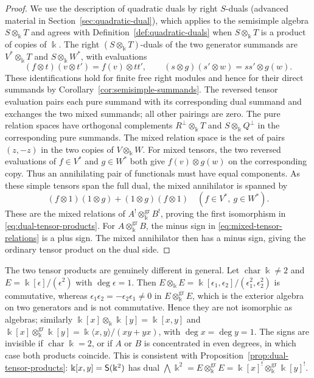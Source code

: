\begin{advanced}[suppressfirstparskip=true,innertopmargin=0pt]
\begin{proof}
We use the description of quadratic duals by right $S$-duals (advanced material in Section~\ref{sec:quadratic-dual}), which applies to the semisimple algebra $S\otimes_\Bbbk T$ and agrees with Definition~\ref{def:quadratic-duals} when $S\otimes_\Bbbk T$ is a product of copies of $\Bbbk$.
The right $(S\otimes_\Bbbk T)$-duals of the two generator summands are $V^*\otimes_\Bbbk T$ and $S\otimes_\Bbbk W^*$, with evaluations
\[
(f\otimes t)(v\otimes t')=f(v)\otimes tt',\qquad
(s\otimes g)(s'\otimes w)=ss'\otimes g(w).
\]
These identifications hold for finite free right modules and hence for their direct summands by Corollary~\ref{cor:semisimple-summands}.
The reversed tensor evaluation pairs each pure summand with its corresponding dual summand and exchanges the two mixed summands; all other pairings are zero.
The pure relation spaces have orthogonal complements $R^\perp\otimes_\Bbbk T$ and $S\otimes_\Bbbk Q^\perp$ in the corresponding pure summands.
The mixed relation space is the set of pairs $(z,-z)$ in the two copies of $V\otimes_\Bbbk W$.
For mixed tensors, the two reversed evaluations of $f\in V^*$ and $g\in W^*$ both give $f(v)\otimes g(w)$ on the corresponding copy.
Thus an annihilating pair of functionals must have equal components. As these simple tensors span the full dual, the mixed annihilator is spanned by
\[
(f\otimes1)(1\otimes g)+(1\otimes g)(f\otimes1)
\quad(f\in V^*,\ g\in W^*).
\]
These are the mixed relations of $A^!\otimes_\Bbbk^{\mathrm{gr}}B^!$, proving the first isomorphism in \eqref{eq:dual-tensor-products}.
For $A\otimes_\Bbbk^{\mathrm{gr}}B$, the minus sign in \eqref{eq:mixed-tensor-relations} is a plus sign. The mixed annihilator then has a minus sign, giving the ordinary tensor product on the dual side.
\end{proof}

\begin{remark}
The two tensor products are genuinely different in general.
Let $\operatorname{char}\Bbbk\neq2$ and $E=\Bbbk[\epsilon]/(\epsilon^2)$ with $\deg\epsilon=1$.
Then $E\otimes_\Bbbk E=\Bbbk[\epsilon_1,\epsilon_2]/(\epsilon_1^2,\epsilon_2^2)$ is commutative, whereas $\epsilon_1\epsilon_2=-\epsilon_2\epsilon_1\neq0$ in $E\otimes_\Bbbk^{\mathrm{gr}}E$, which is the exterior algebra on two generators and is not commutative.
Hence they are not isomorphic as algebras; similarly $\Bbbk[x]\otimes_\Bbbk\Bbbk[y]=\Bbbk[x,y]$ and $\Bbbk[x]\otimes_\Bbbk^{\mathrm{gr}}\Bbbk[y]=\Bbbk\langle x,y\rangle/(xy+yx)$, with $\deg x=\deg y=1$.
The signs are invisible if $\operatorname{char}\Bbbk=2$, or if $A$ or $B$ is concentrated in even degrees, in which case both products coincide.
This is consistent with Proposition~\ref{prop:dual-tensor-products}: $\Bbbk[x,y]=\mathsf{S}(\Bbbk^2)$ has dual $\bigwedge\Bbbk^2=E\otimes_\Bbbk^{\mathrm{gr}}E=\Bbbk[x]^!\otimes_\Bbbk^{\mathrm{gr}}\Bbbk[y]^!$.
\end{remark}


\end{advanced}
